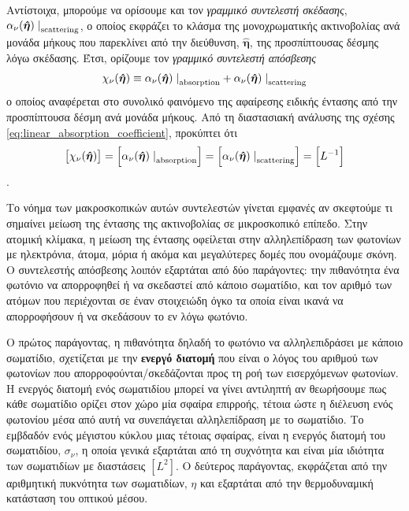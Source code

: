 Αντίστοιχα, μπορούμε να ορίσουμε και τον \textit{γραμμικό συντελεστή σκέδασης}, $\alpha_{\nu}(\boldsymbol{\hat{\eta}}) \left. \right|_{\rm scattering}$, ο οποίος εκφράζει το κλάσμα της μονοχρωματικής ακτινοβολίας ανά μονάδα μήκους που παρεκλίνει από την διεύθυνση, $\boldsymbol{\hat{\eta}}$, της προσπίπτουσας δέσμης λόγω σκέδασης. Έτσι, ορίζουμε τον \textit{γραμμικό συντελεστή απόσβεσης}
\begin{equation}
    \label{eq:linear_extinction_coefficient}
    \chi_{\nu} (\boldsymbol{\hat{\eta}}) \equiv \alpha_{\nu}(\boldsymbol{\hat{\eta}}) \left. \right|_{\rm absorption} + \alpha_{\nu}(\boldsymbol{\hat{\eta}}) \left. \right|_{\rm scattering}
\end{equation}
ο οποίος αναφέρεται στο συνολικό φαινόμενο της αφαίρεσης ειδικής έντασης από την προσπίπτουσα δέσμη ανά μονάδα μήκους. Από τη διαστασιακή ανάλυσης της σχέσης \eqref{eq:linear_absorption_coefficient}, προκύπτει ότι $$\left[\chi_{\nu} (\boldsymbol{\hat{\eta}})\right] = \left[\alpha_{\nu}(\boldsymbol{\hat{\eta}}) \left. \right|_{\rm absorption}\right] = \left[\alpha_{\nu}(\boldsymbol{\hat{\eta}}) \left. \right|_{\rm scattering}\right] = \left[L^{-1}\right]$$.

Το νόημα των μακροσκοπικών αυτών συντελεστών γίνεται εμφανές αν σκεφτούμε τι σημαίνει μείωση της έντασης της ακτινοβολίας σε μικροσκοπικό επίπεδο. Στην ατομική κλίμακα, η μείωση της έντασης οφείλεται στην αλληλεπίδραση των φωτονίων με ηλεκτρόνια, άτομα, μόρια ή ακόμα και μεγαλύτερες δομές που ονομάζουμε σκόνη. Ο συντελεστής απόσβεσης λοιπόν εξαρτάται από δύο παράγοντες: την πιθανότητα ένα φωτόνιο να απορροφηθεί ή να σκεδαστεί από κάποιο σωματίδιο, και τον αριθμό των ατόμων που περιέχονται σε έναν στοιχειώδη όγκο τα οποία είναι ικανά να απορροφήσουν ή να σκεδάσουν το εν λόγω φωτόνιο. 

Ο πρώτος παράγοντας, η πιθανότητα δηλαδή το φωτόνιο να αλληλεπιδράσει με κάποιο σωματίδιο, σχετίζεται με την \textbf{ενεργό διατομή} που είναι ο λόγος του αριθμού των φωτονίων που απορροφούνται/σκεδάζονται προς τη ροή των εισερχόμενων φωτονίων. Η ενεργός διατομή ενός σωματιδίου μπορεί να γίνει αντιληπτή αν θεωρήσουμε πως κάθε σωματίδιο ορίζει στον χώρο μία σφαίρα επιρροής, τέτοια ώστε η διέλευση ενός φωτονίου μέσα από αυτή να συνεπάγεται αλληλεπίδραση με το σωματίδιο. Το εμβδαδόν ενός μέγιστου κύκλου μιας τέτοιας σφαίρας, είναι η ενεργός διατομή του σωματιδίου, $\sigma_{\nu}$, η οποία γενικά εξαρτάται από τη συχνότητα και είναι μία ιδιότητα των σωματιδίων με διαστάσεις $[L^2]$. Ο δεύτερος παράγοντας, εκφράζεται από την αριθμητική πυκνότητα των σωματιδίων, $\eta$ και εξαρτάται από την θερμοδυναμική κατάσταση του οπτικού μέσου.

